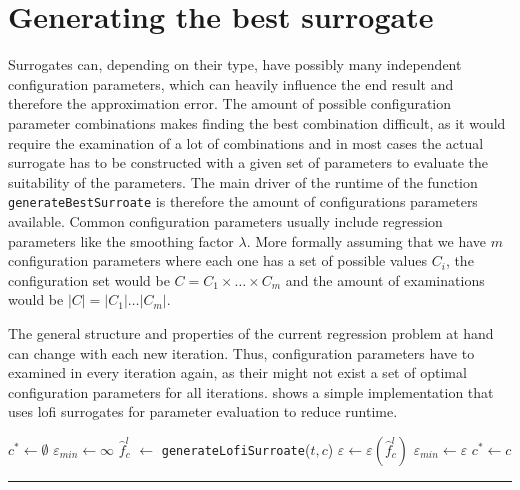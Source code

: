 \documentclass[
  a4paper,  %
  twoside,  %
  bibliography=totoc,
  headsepline,
  cleardoublepage=empty,
  parskip=half,
  draft=false
]{scrbook}
\newcommand{\delimit}{{\color{silver}\noindent\rule{\textwidth}{1pt}}}
\begin{document}
\section{Generating the best surrogate}

Surrogates can, depending on their type, have possibly many independent configuration parameters, which can heavily influence the end result and therefore the approximation error.
The amount of possible configuration parameter combinations makes finding the best combination difficult, as it would require the examination of a lot of combinations and in most cases the actual surrogate has to be constructed with a given set of parameters to evaluate the suitability of the parameters.
The main driver of the runtime of the function \texttt{generateBestSurroate} is therefore the amount of configurations parameters available.
Common configuration parameters usually include regression parameters like the smoothing factor $\lambda$.
More formally assuming that we have $m$ configuration parameters where each one has a set of possible values $C_i$, the configuration set would be $C=C_1 \times \dots \times C_m$ and the amount of examinations would be $|C|=|C_1| \dots |C_m|$.

The general structure and properties of the current regression problem at hand can change with each new iteration.
Thus, configuration parameters have to examined in every iteration again, as their might not exist a set of optimal configuration parameters for all iterations.
 shows a simple implementation that uses lofi surrogates for parameter evaluation to reduce runtime.

\newpage
\begin{mdframed}[style=algstyle,frametitle={\textbf{function} \texttt{generateBestSurroate}{$(C, t)$}}]
\normalsize
\vspace{5.5mm}
\begin{algorithmic}[1]
    \State $c^\ast \gets \emptyset$
    \State $\varepsilon_{min} \gets \infty$
      \State $\hat{f}_c^l$ $\gets$ \texttt{generateLofiSurroate}($t, c$)
    	\State $\varepsilon \gets \varepsilon(\hat{f}_c^l)$
    	  \State $\varepsilon_{min}\gets \varepsilon$
    	\State $c^\ast \gets c$
    	\EndIf
    \EndFor
    \State {}
\end{algorithmic}
\vspace{-1.5mm}
\delimit
	\label{alg:bestsur}
\end{mdframed}
\end{document}
